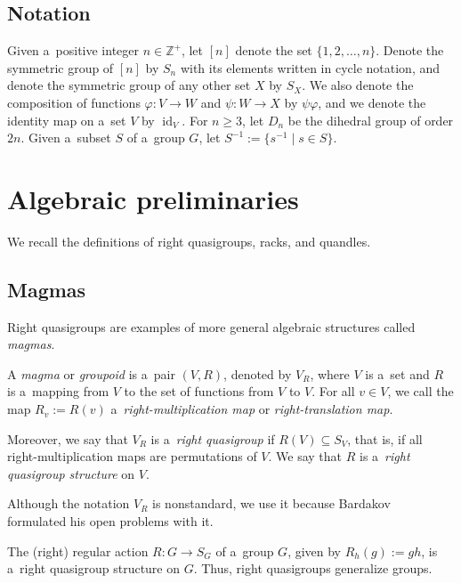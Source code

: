 \documentclass{jonasart}
\DeclareMathOperator{\id}{id}
\newcommand{\inv}{^{-1}}
\newcommand{\Z}{\mathbb{Z}}
\begin{document}
	\subsection*{Notation}
	Given a~positive integer $n\in\Z^+$, let $[n]$ denote the set $\{1,2,\dots,n\}$. Denote the symmetric group of $[n]$ by $S_n$ with its elements written in cycle notation, and denote the symmetric group of any other set $X$ by $S_X$. We also denote the composition of functions $\varphi:V\to W$ and $\psi:W\to X$ by $\psi\varphi$, and we denote the identity map on a~set $V$ by $\id_V$. For $n\geq 3$, let $D_n$ be the dihedral group of order $2n$. Given a~subset $S$ of a~group $G$, let $S\inv:=\{s\inv\mid s\in S\}$.


	\section{Algebraic preliminaries}\label{sec:prelims}

	We recall the definitions of right quasigroups, racks, and quandles.

	\subsection{Magmas} Right quasigroups are examples of more general algebraic structures called \emph{magmas}.

	\begin{definition}
		A \emph{magma} or \emph{groupoid} is a~pair $(V,R)$, denoted by $V_R$, where $V$ is a~set and $R$ is a~mapping from $V$ to the set of functions from $V$ to $V$. For all $v\in V$, we call the map $R_v:= R(v)$ a~\emph{right-multiplication map} or \emph{right-translation map}.

		Moreover, we say that $V_R$ is a~\emph{right quasigroup} if $R(V)\subseteq S_V$, that is, if all right-multiplication maps are permutations of $V$. We say that $R$ is a~\emph{right quasigroup structure} on $V$.
	\end{definition}

	\begin{remark}
		Although the notation $V_R$ is nonstandard, we use it because Bardakov~\cite{bardakov} formulated his open problems with it.
	\end{remark}

	\begin{example}\label{ex:right0}
		The (right) regular action $R:G\to S_G$ of a~group $G$, given by $R_h (g):=gh$, is a~right quasigroup structure on $G$. Thus, right quasigroups generalize groups.
	\end{example}
\end{document}
